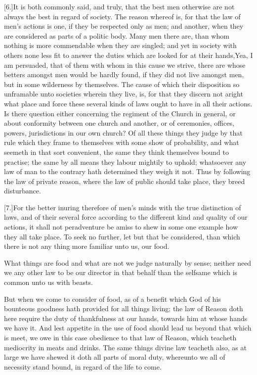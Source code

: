 [6.]It is both commonly said, and truly, that the best men otherwise are not always the best in regard of society. The reason whereof is, for that the law of men’s actions is one, if they be respected only as men; and another, when they are considered as parts of a politic body. Many men there are, than whom nothing is more commendable when they are singled; and yet in society with others none less fit to answer the duties which are looked for at their hands,Yea, I am persuaded, that of them with whom in this cause we strive, there are whose betters amongst men would be hardly found, if they did not live amongst men, but in some wilderness by themselves. The cause of which their disposition so unframable unto societies wherein they live, is, for that they discern not aright what place and force these several kinds of laws ought to have in all their actions. Is there question either concerning the regiment of the Church in general, or about conformity between one church and another, or of ceremonies, offices, powers, jurisdictions in our own church? Of all these things they judge by that rule which they frame to themselves with some show of probability, and what seemeth in that sort convenient, the same they think themselves bound to practise; the same by all means they labour mightily to uphold; whatsoever any law of man to the contrary hath determined they weigh it not. Thus by following the law of private reason, where the law of public should take place, they breed disturbance.

[7.]For the better inuring therefore of men’s minds with  the true distinction of laws, and of their several force according to the different kind and quality of our actions, it shall not peradventure be amiss to shew in some one example how they all take place. To seek no further, let but that be considered, than which there is not any thing more familiar unto us, our food.

What things are food and what are not we judge naturally by sense; neither need we any other law to be our director in that behalf than the selfsame which is common unto us with beasts.

But when we come to consider of food, as of a benefit which God of his bounteous goodness hath provided for all things living; the law of Reason doth here require the duty of thankfulness at our hands, towards him at whose hands we have it. And lest appetite in the use of food should lead us beyond that which is meet, we owe in this case obedience to that law of Reason, which teacheth mediocrity in meats and drinks. The same things divine law teacheth also, as at large we have shewed it doth all parts of moral duty, whereunto we all of necessity stand bound, in regard of the life to come.


